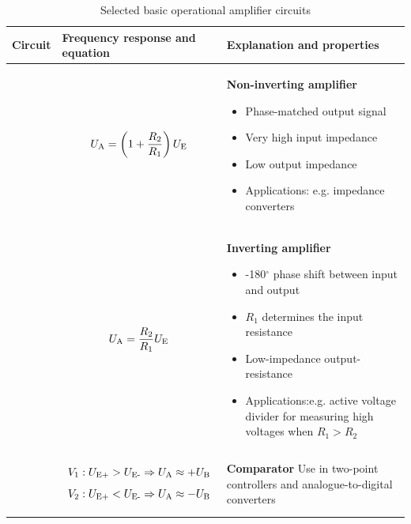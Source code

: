 \begin{table}[ht]
    \renewcommand{\tablename}{Table}
    \caption{Selected basic operational amplifier circuits}
    \label{tab:Grundschaltungen}
    \begin{tabular}{|m{}|m{}|m{}|}
    \hline
    Circuit & Frequency response and equation & Explanation and properties\\ %
    \hline
    \vspace{0.5cm}
    \centering
     & 
\vspace{1ex}
\[
U_{\textnormal{A}} = \left(1+\frac{R_2}{R_1}\right) U_{\textnormal{E}}
\]
    &
    \textbf{Non-inverting amplifier}
\begin{itemize}
        \item Phase-matched output signal
        \item Very high input impedance
        \item Low output impedance
        \item Applications: e.g. impedance converters
\end{itemize} \\
    \hline
    \centering
    
     & 
    \begin{center}
        
\end{center}
\vspace{1ex}
\[
    U_{\textnormal{A}} = \frac{R_2}{R_1} U_{\textnormal{E}}
\]
    &
    \textbf{Inverting amplifier}
\begin{itemize}
        \item -180$^\circ$ phase shift between input and output
        \item $R_1$ determines the input resistance
        \item Low-impedance output-\linebreak resistance
        \item Applications:\linebreak e.g. active voltage divider for measuring high voltages when $R_1 > R_2$
\end{itemize}
\\ %
    \hline
    \centering
    
    & 
    \begin{center}
               
\[
V_1: U_{\textnormal{E+}} > U_{\textnormal{E-}} \Rightarrow U_{\textnormal{A}} \approx +U_{\textnormal{B}}
\]
\[
V_2: U_{\textnormal{E+}} < U_{\textnormal{E-}} \Rightarrow U_{\textnormal{A}} \approx -U_{\textnormal{B}}
\]
\end{center}
    &\textbf{Comparator}\newline
    Use in two-point controllers and analogue-to-digital converters
\\ %
    \hline


\end{tabular}
\end{table}
